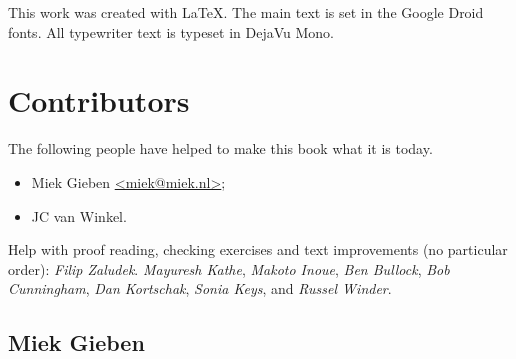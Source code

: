 \noindent{}This work was created with \LaTeX. The main text is set in
the Google Droid fonts. All typewriter text is typeset in DejaVu Mono.

\section{Contributors}
The following people have helped to make this book what it is today.
\begin{itemize}
\item{Miek Gieben \qquad\url{<miek@miek.nl>}};
\item{JC van Winkel}.
\end{itemize}

Help with proof reading, checking exercises and text improvements (no
particular order):
\emph{Filip Zaludek}.
\emph{Mayuresh Kathe},
\emph{Makoto Inoue},
\emph{Ben Bullock},
\emph{Bob Cunningham},
\emph{Dan Kortschak},
\emph{Sonia Keys},
and \emph{Russel Winder}.

\subsection{Miek Gieben}

